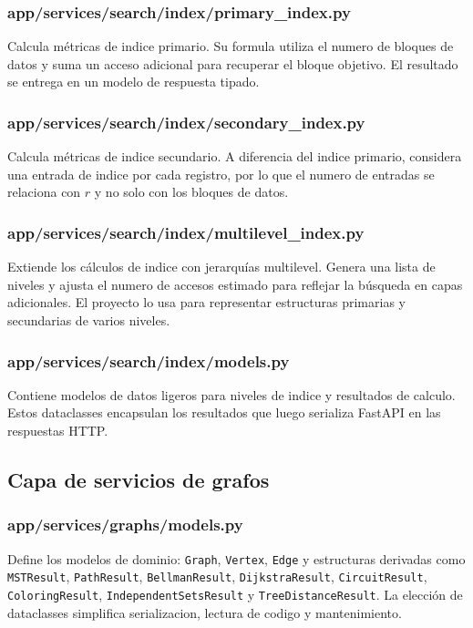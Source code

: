 \documentclass[12pt,onecolumn]{IEEEtran}
\begin{document}
\subsubsection{app/services/search/index/primary\_index.py}
Calcula métricas de indice primario. Su formula utiliza el numero de bloques de datos y suma un acceso adicional para recuperar el bloque objetivo. El resultado se entrega en un modelo de respuesta tipado.

\subsubsection{app/services/search/index/secondary\_index.py}
Calcula métricas de indice secundario. A diferencia del indice primario, considera una entrada de indice por cada registro, por lo que el numero de entradas se relaciona con \(r\) y no solo con los bloques de datos.

\subsubsection{app/services/search/index/multilevel\_index.py}
Extiende los cálculos de indice con jerarquías multilevel. Genera una lista de niveles y ajusta el numero de accesos estimado para reflejar la búsqueda en capas adicionales. El proyecto lo usa para representar estructuras primarias y secundarias de varios niveles.

\subsubsection{app/services/search/index/models.py}
Contiene modelos de datos ligeros para niveles de indice y resultados de calculo. Estos dataclasses encapsulan los resultados que luego serializa FastAPI en las respuestas HTTP.

\subsection{Capa de servicios de grafos}
\subsubsection{app/services/graphs/models.py}
Define los modelos de dominio: \texttt{Graph}, \texttt{Vertex}, \texttt{Edge} y estructuras derivadas como \texttt{MSTResult}, \texttt{PathResult}, \texttt{BellmanResult}, \texttt{DijkstraResult}, \texttt{CircuitResult}, \texttt{ColoringResult}, \texttt{IndependentSetsResult} y \texttt{TreeDistanceResult}. La elección de dataclasses simplifica serializacion, lectura de codigo y mantenimiento.
\end{document}
